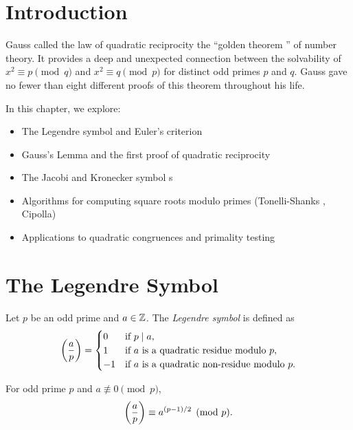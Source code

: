 \section{Introduction}

Gauss called the law of quadratic reciprocity  the ``golden theorem '' of number theory. It provides a deep and unexpected connection between the solvability of $x^2 \equiv p \pmod{q}$ and $x^2 \equiv q \pmod{p}$ for distinct odd primes $p$ and $q$. Gauss gave no fewer than eight different proofs of this theorem throughout his life.

In this chapter, we explore:
\begin{itemize}
    \item The Legendre symbol and Euler's criterion 
    \item Gauss's Lemma  and the first proof of quadratic reciprocity
    \item The Jacobi and Kronecker symbol s
    \item Algorithms for computing square roots modulo primes (Tonelli-Shanks , Cipolla)
    \item Applications to quadratic congruences and primality testing
\end{itemize}

\section{The Legendre Symbol}

\begin{definition}
Let $p$ be an odd prime and $a \in \mathbb{Z}$. The \textit{Legendre symbol}  is defined as
\[
\legendre{a}{p} = 
\begin{cases}
0 & \text{if } p \mid a, \\
1 & \text{if } a \text{ is a quadratic residue \index{quadratic residue} modulo } p, \\
-1 & \text{if } a \text{ is a quadratic non-residue \index{quadratic non-residue} modulo } p.
\end{cases}
\]
\end{definition}

\begin{theorem}
For odd prime $p$ and $a \not\equiv 0 \pmod{p}$,
\[
\left(\frac{a}{p}\right) \equiv a^{(p-1)/2} \pmod{p}.
\]
\end{theorem}

